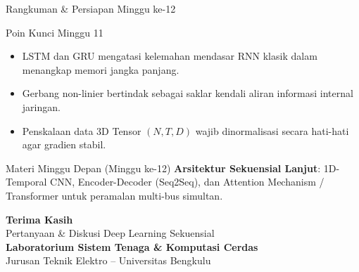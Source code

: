 \documentclass[aspectratio=169, 10pt]{beamer}
\begin{document}
\begin{frame}{Rangkuman \& Persiapan Minggu ke-12}
    \begin{block}{Poin Kunci Minggu 11}
        \begin{itemize}
            \item LSTM dan GRU mengatasi kelemahan mendasar RNN klasik dalam menangkap memori jangka panjang.
            \item Gerbang non-linier bertindak sebagai saklar kendali aliran informasi internal jaringan.
            \item Penskalaan data 3D Tensor $(N, T, D)$ wajib dinormalisasi secara hati-hati agar gradien stabil.
        \end{itemize}
    \end{block}
    \vspace{0.2cm}
    \begin{alertblock}{Materi Minggu Depan (Minggu ke-12)}
        \textbf{Arsitektur Sekuensial Lanjut}: 1D-Temporal CNN, Encoder-Decoder (Seq2Seq), dan Attention Mechanism / Transformer untuk peramalan multi-bus simultan.
    \end{alertblock}
\end{frame}

\begin{frame}[plain]
    \begin{center}
        \vspace{1.5cm}
        {\Huge \color{mainblue} \textbf{Terima Kasih}}\\[0.4cm]
        {\large Pertanyaan \& Diskusi Deep Learning Sekuensial}\\[1.2cm]
        \textbf{Laboratorium Sistem Tenaga \& Komputasi Cerdas}\\
        Jurusan Teknik Elektro -- Universitas Bengkulu
    \end{center}
\end{frame}
\end{document}
